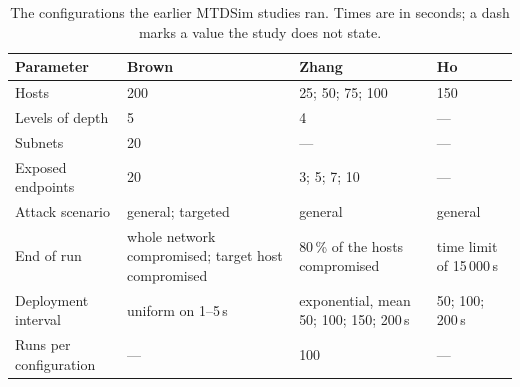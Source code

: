 \begin{table}[htbp]
  \centering
  \caption[The configurations of the earlier MTDSim studies]{The configurations the earlier MTDSim studies ran. Times are in seconds; a dash marks a value the study does not state.}
  \label{tab:lineage-configurations}
  \tablestyle
  \begin{tabular}{@{}P{3.0cm}P{3.7cm}P{4.6cm}P{3.4cm}@{}}
    \toprule
    Parameter & Brown \citep{brown2023} & Zhang \citep{zhang2023} & Ho \citep{ho2024} \\
    \midrule
    Hosts & 200 & 25; 50; 75; 100 & 150 \\
    Levels of depth & 5 & 4 & --- \\
    Subnets & 20 & --- & --- \\
    Exposed endpoints & 20 & 3; 5; 7; 10 & --- \\
    Attack scenario & general; targeted & general & general \\
    End of run & whole network compromised; target host compromised & 80\,\% of the hosts compromised & time limit of 15\,000\,s \\
    Deployment interval & uniform on 1--5\,s & exponential, mean 50; 100; 150; 200\,s & 50; 100; 200\,s \\
    Runs per configuration & --- & 100 & --- \\
    \bottomrule
  \end{tabular}
\end{table}
